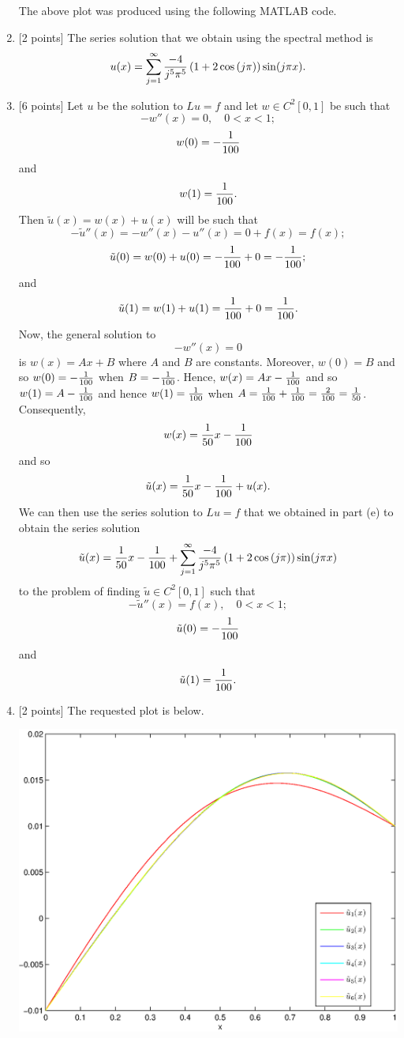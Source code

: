 \begin{solution}
\begin{enumerate}
The above plot was produced using the following MATLAB code.



\item {[2 points]} The series solution that we obtain using the spectral method is
\[
u(x)=\sum_{j=1}^\infty{-4\over j^5\pi^5}\left(1+2\cos\left(j\pi\right)\right)\sin(j\pi x).
\]

\item {[6 points]} Let $u$ be the solution to $Lu=f$ and let $w\in C^2[0,1]$ be such that
\[
-w''(x)=0,\quad0<x<1;
\]
\[
w(0)=-{1\over100}
\]
and
\[
w(1)={1\over100}.
\]
Then $\tilde{u}(x)=w(x)+u(x)$ will be such that
\[
-\tilde{u}''(x)=-w''(x)-u''(x)=0+f(x)=f(x);
\]
\[
\tilde{u}(0)=w(0)+u(0)=-{1\over100}+0=-{1\over100};
\]
and
\[
\tilde{u}(1)=w(1)+u(1)={1\over100}+0={1\over100}.
\]
Now, the general solution to
\[
-w''(x)=0
\]
is $w(x)=Ax+B$ where $A$ and $B$ are constants. Moreover, $w(0)=B$ and so $w(0)=-{1\over100}$ when $B=-{1\over100}$. Hence, $w(x)=Ax-{1\over100}$ and so $w(1)=A-{1\over100}$ and hence $w(1)={1\over100}$ when $A={1\over100}+{1\over100}={2\over100}={1\over50}$. Consequently,
\[
w(x)={1\over50}x-{1\over100}
\]
and so
\[
\tilde{u}(x)={1\over50}x-{1\over100}+u(x).
\]
We can then use the series solution to $Lu=f$ that we obtained in part (e) to obtain the series solution
\[
\tilde{u}(x)={1\over50}x-{1\over100}+\sum_{j=1}^\infty{-4\over j^5\pi^5}\left(1+2\cos\left(j\pi\right)\right)\sin(j\pi x)
\]
to the problem of finding $\tilde{u}\in C^2[0,1]$ such that
\[
-\tilde{u}''(x)=f(x),\quad0<x<1;
\]
\[
\tilde{u}(0)=-{1\over100}
\]
and
\[
\tilde{u}(1)={1\over100}.
\]

\item {[2 points]} The requested plot is below.

\begin{center}\includegraphics[scale=0.7]{hw27g.eps}\end{center}


\end{enumerate}
\end{solution}
